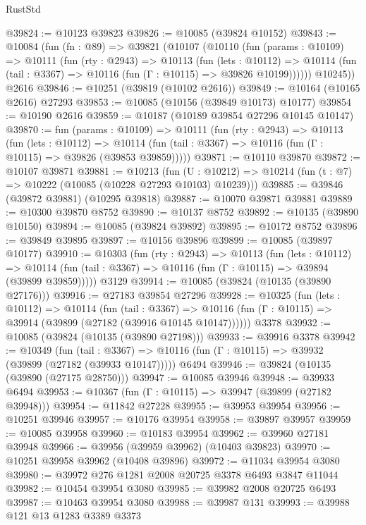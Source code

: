 \begin{lexlean}{RustStd}
\begin{coremodule}
@39824 := @10123 @39823
@39826 := @10085 (@39824 @10152)
@39843 := @10084
    (fun (fn : @89) =>
    @39821
      (@10107
        (@10110
          (fun (params : @10109) =>
          @10111
            (fun (rty : @2943) =>
            @10113
              (fun (lets : @10112) =>
              @10114 (fun (tail : @3367) => @10116 (fun (Γ : @10115) => @39826 @10199))))))
        @10245))
    @2616
@39846 := @10251 (@39819 (@10102 @2616))
@39849 := @10164 (@10165 @2616) @27293
@39853 := @10085 (@10156 (@39849 @10173) @10177)
@39854 := @10190 @2616
@39859 := @10187 (@10189 @39854 @27296 @10145 @10147)
@39870 := fun (params : @10109) =>
  @10111
    (fun (rty : @2943) =>
    @10113
      (fun (lets : @10112) =>
      @10114 (fun (tail : @3367) => @10116 (fun (Γ : @10115) => @39826 (@39853 @39859)))))
@39871 := @10110 @39870
@39872 := @10107 @39871
@39881 := @10213
    (fun (U : @10212) => @10214 (fun (t : @7) => @10222 (@10085 (@10228 @27293 @10103) @10239)))
@39885 := @39846 (@39872 @39881) (@10295 @39818)
@39887 := @10070 @39871 @39881
@39889 := @10300 @39870 @8752
@39890 := @10137 @8752
@39892 := @10135 (@39890 @10150)
@39894 := @10085 (@39824 @39892)
@39895 := @10172 @8752
@39896 := @39849 @39895
@39897 := @10156 @39896
@39899 := @10085 (@39897 @10177)
@39910 := @10303
    (fun (rty : @2943) =>
    @10113
      (fun (lets : @10112) =>
      @10114 (fun (tail : @3367) => @10116 (fun (Γ : @10115) => @39894 (@39899 @39859)))))
    @3129
@39914 := @10085 (@39824 (@10135 (@39890 @27176)))
@39916 := @27183 @39854 @27296
@39928 := @10325
    (fun (lets : @10112) =>
    @10114
      (fun (tail : @3367) =>
      @10116 (fun (Γ : @10115) => @39914 (@39899 (@27182 (@39916 @10145 @10147))))))
    @3378
@39932 := @10085 (@39824 (@10135 (@39890 @27198)))
@39933 := @39916 @3378
@39942 := @10349
    (fun (tail : @3367) => @10116 (fun (Γ : @10115) => @39932 (@39899 (@27182 (@39933 @10147)))))
    @6494
@39946 := @39824 (@10135 (@39890 (@27175 @28750)))
@39947 := @10085 @39946
@39948 := @39933 @6494
@39953 := @10367 (fun (Γ : @10115) => @39947 (@39899 (@27182 @39948)))
@39954 := @11842 @27228
@39955 := @39953 @39954
@39956 := @10251 @39946
@39957 := @10176 @39954
@39958 := @39897 @39957
@39959 := @10085 @39958
@39960 := @10183 @39954
@39962 := @39960 @27181 @39948
@39966 := @39956 (@39959 @39962) (@10403 @39823)
@39970 := @10251 @39958 @39962 (@10408 @39896)
@39972 := @11034 @39954 @3080
@39980 := @39972 @276 @1281 @2008 @20725 @3378 @6493 @3847 @11044
@39982 := @10454 @39954 @3080
@39985 := @39982 @2008 @20725 @6493
@39987 := @10463 @39954 @3080
@39988 := @39987 @131
@39993 := @39988 @121 @13 @1283 @3389 @3373

\end{coremodule}
\end{lexlean}
